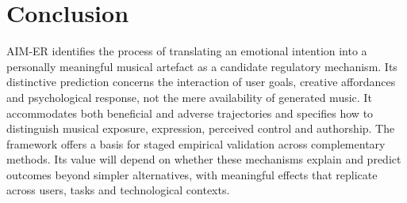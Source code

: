 \documentclass[11pt,a4paper]{article}
\begin{document}
\section{Conclusion}
AIM-ER identifies the process of translating an emotional intention into a personally meaningful musical artefact as a candidate regulatory mechanism. Its distinctive prediction concerns the interaction of user goals, creative affordances and psychological response, not the mere availability of generated music. It accommodates both beneficial and adverse trajectories and specifies how to distinguish musical exposure, expression, perceived control and authorship. The framework offers a basis for staged empirical validation across complementary methods. Its value will depend on whether these mechanisms explain and predict outcomes beyond simpler alternatives, with meaningful effects that replicate across users, tasks and technological contexts.

\printbibliography
\end{document}
